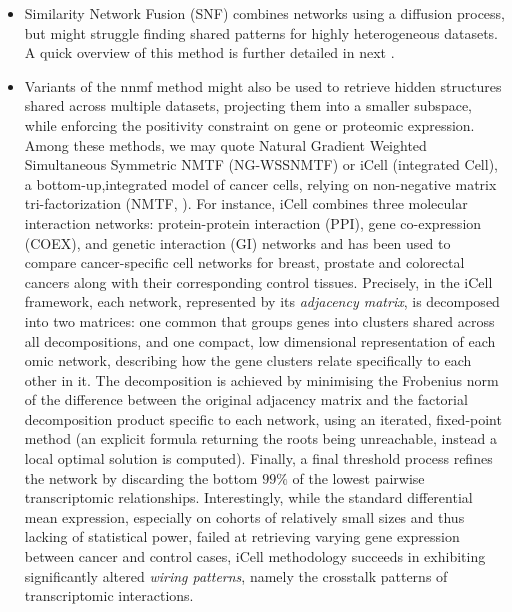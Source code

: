 \documentclass[mainlanguage=english,numlaboratories=2, nofrontcover=true,noaim=false, localbibs, colophon-location=verso-frontcover, oneside, 10pt, localtocs, version=final, nomakeabstract=true]{yathesis}
\begin{document}
\begin{itemize}

\item Similarity Network Fusion (SNF) \autocite{wang_etal14} combines networks using a diffusion process, but might struggle finding shared patterns for highly heterogeneous datasets. A quick overview of this method is further detailed in next .

\item Variants of the \acrshort{nnmf} method might also be used to retrieve hidden structures shared across multiple datasets, projecting them into a smaller subspace, while enforcing the positivity constraint on gene or proteomic expression. Among these methods, we may quote Natural Gradient Weighted Simultaneous Symmetric NMTF (NG-WSSNMTF) \autocite{gligorijevic_etal16} or iCell (integrated Cell), a bottom-up,integrated model of cancer cells, relying on non-negative matrix tri-factorization (NMTF, \autocite{malod-dognin_etal19}).
For instance, iCell combines three molecular interaction networks: protein-protein interaction (PPI), gene co-expression (COEX), and genetic interaction (GI) networks and has been used to compare cancer-specific cell networks for breast, prostate and colorectal cancers along with their corresponding control tissues.  Precisely, in the iCell framework, each network, represented by its \emph{adjacency matrix}, is decomposed into two matrices: one common that groups genes into clusters shared across all decompositions, and one compact, low dimensional representation of each omic network, describing how the gene clusters relate specifically to each other in it. The decomposition is achieved by minimising the Frobenius norm of the difference between the original adjacency matrix and the factorial decomposition product specific to each network, using an iterated, fixed-point method (an explicit formula returning the roots being unreachable, instead a local optimal solution is computed). Finally, a final threshold process refines the network by discarding the bottom $99\%$ of the lowest pairwise transcriptomic relationships. Interestingly, while the standard differential mean expression, especially on cohorts of relatively small sizes and thus lacking of statistical power, failed at retrieving varying gene expression between cancer and control cases, iCell methodology succeeds in exhibiting significantly altered \emph{wiring patterns}, namely the crosstalk patterns of transcriptomic interactions.


\end{itemize}
\end{document}

